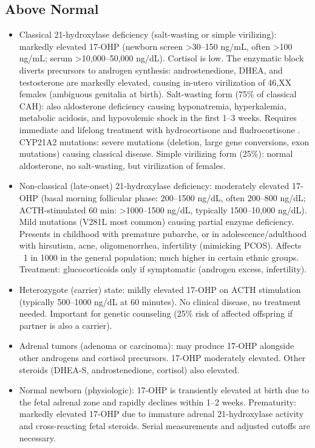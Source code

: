 \subsection*{Above Normal}
\begin{itemize}
  \item Classical 21-hydroxylase deficiency (salt-wasting or simple virilizing): markedly elevated 17-OHP (newborn screen >30--150 ng/mL, often >100 ng/mL; serum >10,000--50,000 ng/dL). Cortisol is low. The enzymatic block diverts precursors to androgen synthesis: androstenedione, DHEA, and testosterone are markedly elevated, causing in-utero virilization of 46,XX females (ambiguous genitalia at birth). Salt-wasting form (75\% of classical CAH): also aldosterone deficiency causing hyponatremia, hyperkalemia, metabolic acidosis, and hypovolemic shock in the first 1--3 weeks. Requires immediate and lifelong treatment with hydrocortisone and fludrocortisone \cite{merke2005congenital}. CYP21A2 mutations: severe mutations (deletion, large gene conversions, exon mutations) causing classical disease. Simple virilizing form (25\%): normal aldosterone, no salt-wasting, but virilization of females.
  \item Non-classical (late-onset) 21-hydroxylase deficiency: moderately elevated 17-OHP (basal morning follicular phase: 200--1500 ng/dL, often 200--800 ng/dL; ACTH-stimulated 60 min: >1000--1500 ng/dL, typically 1500--10,000 ng/dL). Mild mutations (V281L most common) causing partial enzyme deficiency. Presents in childhood with premature pubarche, or in adolescence/adulthood with hirsutism, acne, oligomenorrhea, infertility (mimicking PCOS). Affects ~1 in 1000 in the general population; much higher in certain ethnic groups. Treatment: glucocorticoids only if symptomatic (androgen excess, infertility).
  \item Heterozygote (carrier) state: mildly elevated 17-OHP on ACTH stimulation (typically 500--1000 ng/dL at 60 minutes). No clinical disease, no treatment needed. Important for genetic counseling (25\% risk of affected offspring if partner is also a carrier).
  \item Adrenal tumors (adenoma or carcinoma): may produce 17-OHP alongside other androgens and cortisol precursors. 17-OHP moderately elevated. Other steroids (DHEA-S, androstenedione, cortisol) also elevated.
  \item Normal newborn (physiologic): 17-OHP is transiently elevated at birth due to the fetal adrenal zone and rapidly declines within 1--2 weeks. Prematurity: markedly elevated 17-OHP due to immature adrenal 21-hydroxylase activity and cross-reacting fetal steroids. Serial measurements and adjusted cutoffs are necessary.

\end{itemize}
